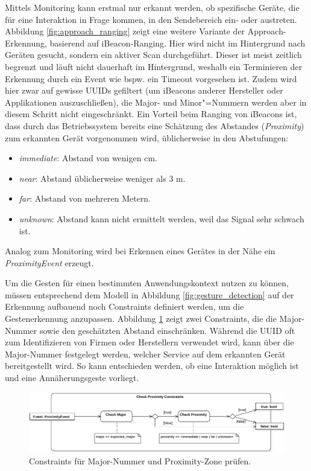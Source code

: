 Mittels Monitoring kann erstmal nur erkannt werden, ob spezifische Geräte, die für eine Interaktion in Frage kommen, in den Sendebereich ein- oder austreten. Abbildung \ref{fig:approach_ranging} zeigt eine weitere Variante der Approach-Erkennung, basierend auf iBeacon-Ranging. Hier wird nicht im Hintergrund nach Geräten gesucht, sondern ein aktiver Scan durchgeführt. Dieser ist meist zeitlich begrenzt und läuft nicht dauerhaft im Hintergrund, weshalb ein Terminieren der Erkennung durch ein Event wie bspw. ein Timeout vorgesehen ist. Zudem wird hier zwar auf gewisse UUIDs gefiltert (um \zb iBeacons anderer Hersteller oder Applikationen auszuschließen), die Major- und Minor"=Nummern werden aber in diesem Schritt nicht eingeschränkt. Ein Vorteil beim Ranging von iBeacons ist, dass durch das Betriebssystem bereits eine Schätzung des Abstandes (\textit{Proximity}) zum erkannten Gerät vorgenommen wird, üblicherweise in den Abstufungen:
\begin{itemize}
\item \textit{immediate}: Abstand von wenigen cm.
\item \textit{near}: Abstand üblicherweise weniger als 3 m.
\item \textit{far}: Abstand von mehreren Metern.
\item \textit{unknown}: Abstand kann nicht ermittelt werden, weil das Signal sehr schwach ist.
\end{itemize}
Analog zum Monitoring wird bei Erkennen eines Gerätes in der Nähe ein  \textit{ProximityEvent} erzeugt.

Um die Gesten für einen bestimmten Anwendungskontext nutzen zu können, müssen entsprechend dem Modell in Abbildung \ref{fig:gesture_detection} auf der Erkennung aufbauend noch Constraints definiert werden, um die Gestenerkennung anzupassen. Abbildung \ref{fig:approach_check_proximity} zeigt zwei Constraints, die die Major-Nummer sowie den geschätzten Abstand einschränken. Während die UUID oft zum Identifizieren von Firmen oder Herstellern verwendet wird, kann über die Major-Nummer \zb festgelegt werden, welcher Service auf dem erkannten Gerät bereitgestellt wird. So kann entschieden werden, ob eine Interaktion möglich ist und eine Annäherungsgeste vorliegt.
\begin{figure}[h]
\centering
\includegraphics[page=1,width=1\textwidth]{bilder/approach/check_constraints}
\caption{Constraints für Major-Nummer und Proximity-Zone prüfen.}
\label{fig:approach_check_proximity}
\end{figure}

